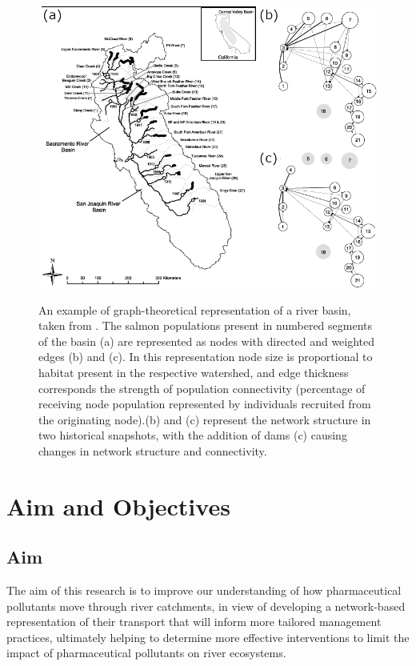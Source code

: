 \documentclass{article}
\begin{document}
\begin{figure}
    \centering
    \includegraphics[height=10cm]{fig_graph_schick.png}
    \caption{An example of graph-theoretical representation of a river basin, taken from \citet{Schick2007DirectedNetwork}. The salmon populations present in numbered segments of the basin (a) are represented as nodes with directed and weighted edges (b) and (c). In this representation node size is proportional to habitat present in the respective watershed, and edge thickness corresponds the strength of population connectivity (percentage of receiving node population represented by individuals recruited from the originating node).(b) and (c) represent the network structure in two historical snapshots, with the addition of dams (c) causing changes in network structure and connectivity.}
    \label{fig_graph_schick}
\end{figure}

\clearpage
\section{Aim and Objectives}
\subsection{Aim}
The aim of this research is to improve our understanding of how pharmaceutical pollutants move through river catchments, in view of developing a network-based representation of their transport that will inform more tailored management practices, ultimately helping to determine more effective interventions to limit the impact of pharmaceutical pollutants on river ecosystems. 
\end{document}
